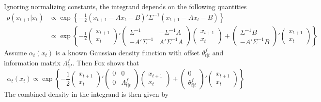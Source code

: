 \documentclass{article} %
\begin{document}
Ignoring normalizing constants, the integrand depends on the following quantities
\begin{align*}
p(x_{t+1}|x_t)&\propto \exp\left\{-\frac{1}{2}(x_{t+1}-Ax_t-B)'\Sigma^{-1}(x_{t+1}-Ax_t-B)\right\}\\
&\propto \exp\left\{-\frac{1}{2}\begin{pmatrix}x_{t+1}\\x_t\end{pmatrix}'
    \begin{pmatrix}\Sigma^{-1} & -\Sigma^{-1}A\\
    -A'\Sigma^{-1} & A'\Sigma^{-1}A\end{pmatrix}\begin{pmatrix}x_{t+1}\\x_t\end{pmatrix}
    + \begin{pmatrix}\Sigma^{-1}B\\-A'\Sigma^{-1}B\end{pmatrix}'\begin{pmatrix}x_{t+1}\\x_t\end{pmatrix}\right\}
\end{align*}
Assume $\alpha_t(x_t)$ is a known Gaussian density function with offset $\theta^f_{t|t}$ and information matrix $\Lambda^f_{t|t}$. Then Fox shows that
\[\alpha_t(x_t)\propto\exp\left\{-\frac{1}{2}\begin{pmatrix}x_{t+1}\\x_t\end{pmatrix}'
    \begin{pmatrix}0 & 0\\
    0 & \Lambda^f_{t|t}\end{pmatrix}\begin{pmatrix}x_{t+1}\\x_t\end{pmatrix}
    + \begin{pmatrix}0\\ \theta^f_{t|t}\end{pmatrix}'\begin{pmatrix}x_{t+1}\\x_t\end{pmatrix}\right\}\]
The combined density in the integrand is then given by
\end{document}
